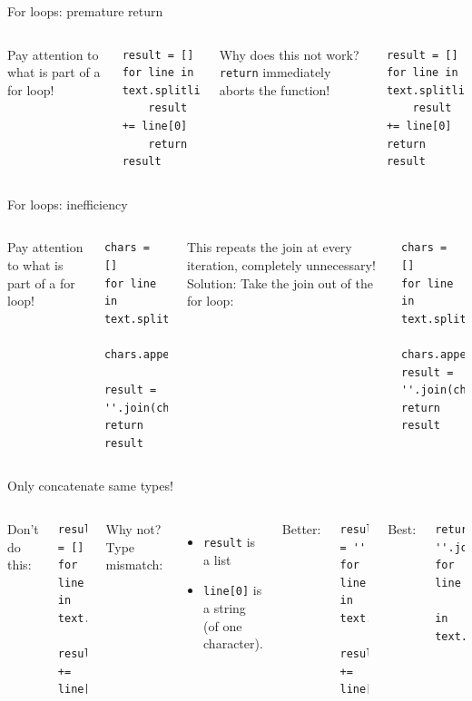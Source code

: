 \documentclass[aspectratio=169,usenames,dvipsnames]{beamer}
\begin{document}
\begin{frame}[fragile]{For loops: premature return}
\begin{columns}
Pay attention to what is part of a for loop!
\begin{lstlisting}
result = []
for line in text.splitlines():
    result += line[0]
    return result
\end{lstlisting}
Why does this not work?
\pause{}
\texttt{return} immediately aborts the function!
\begin{lstlisting}
result = []
for line in text.splitlines():
    result += line[0]
return result
\end{lstlisting}
\end{columns}
\end{frame}

\begin{frame}[fragile]{For loops: inefficiency}
\begin{columns}[T]
Pay attention to what is part of a for loop!
\begin{lstlisting}
chars = []
for line in text.splitlines():
    chars.append(line[0])
    result = ''.join(chars)
return result
\end{lstlisting}
\pause
This repeats the join at every iteration, completely unnecessary!
Solution: Take the join out of the for loop:
\begin{lstlisting}
chars = []
for line in text.splitlines():
    chars.append(line[0])
result = ''.join(chars)
return result
\end{lstlisting}
\end{columns}
\end{frame}

\begin{frame}[fragile]{Only concatenate same types!}
\begin{columns}[T]
Don't do this:
\begin{lstlisting}
result = []
for line in text.splitlines():
    result += line[0]
\end{lstlisting}
Why not? \pause
Type mismatch:
    \begin{itemize}
        \item \texttt{result} is a list
        \item \texttt{line[0]} is a string \\
            (of one character).
    \end{itemize}
Better:
\begin{lstlisting}
result = ''
for line in text.splitlines():
    result += line[0]
\end{lstlisting}
Best:
\begin{lstlisting}
return ''.join(line[0] for line
        in text.splitlines())
\end{lstlisting}
\end{columns}
\end{frame}
\end{document}
